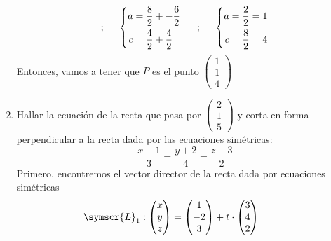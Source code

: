 \documentclass{article}
\def\fancyL{\symscr{L}}
\begin{document}
\begin{enumerate}
\[            \text{;}
            \hspace{0.5cm}
            \left\{
                \begin{aligned}
                    a &= \frac{8}{2} + -\frac{6}{2} \\
                    c &= \frac{4}{2} + \frac{4}{2}
                \end{aligned}
            \right.
            \hspace{0.5cm}
            \text{;}
            \hspace{0.5cm}
            \left\{
                \begin{aligned}
                    a &= \frac{2}{2} = 1 \\
                    c &= \frac{8}{2} = 4
                \end{aligned}
            \right.
        \]
        Entonces, vamos a tener que \(P\) es el punto 
        \(
            \begin{pmatrix}
                1 \\ 1 \\ 4
            \end{pmatrix}
        \)
    \item Hallar la ecuación de la recta que pasa por \(\left(\begin{smallmatrix}2 \\ 1 \\ 5\end{smallmatrix}\right)\) y corta en forma perpendicular a la recta dada por las ecuaciones simétricas:
        \[
            \frac{x - 1}{3} = \frac{y + 2}{4} = \frac{z - 3}{2}
        \]
        Primero, encontremos el vector director de la recta dada por ecuaciones simétricas
        \[
            \fancyL_1 : 
            \begin{pmatrix}
                x \\ y \\ z
            \end{pmatrix} =
            \begin{pmatrix}
                1 \\ -2 \\ 3
            \end{pmatrix}
            + 
            t \cdot
            \begin{pmatrix}
                3 \\ 4 \\ 2
            \end{pmatrix}
            \hspace{1cm}
\]
\end{enumerate}
\end{document}
